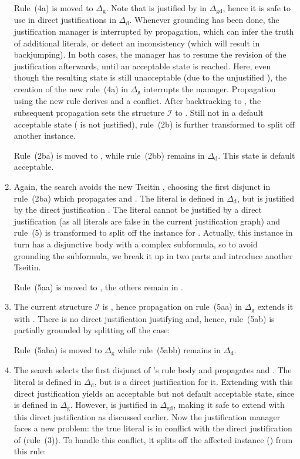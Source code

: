 \documentclass[11pt]{article}
\newcommand{\m}[1]{\ensuremath{#1}\xspace}
\newcommand{\I}{\m{\mathcal{I}}}
\newcommand{\D}{\m{\Delta}}
\theoremstyle{plain}
\theoremstyle{definition}
\theoremstyle{example_basic}
\theoremstyle{example_contd}
\theoremstyle{plain}
\newcommand{\Dg}{\ensuremath{\D_\text{g}}\xspace}
\newcommand{\Dd}{\ensuremath{\D_\text{d}}\xspace}
\newcommand{\Dgd}{\ensuremath{\D_\text{gd}}\xspace}
\newcommand{\change}[1]{#1}
\begin{document}
\begin{enumerate}
  Rule~(4a) is moved to \Dg. \change{Note that  is justified by  in \Dgd,} hence it is safe to use  in direct justifications in \Dd. \change{Whenever grounding has been done, the justification manager is interrupted by propagation, which can infer the truth of additional literals, or detect an inconsistency (which will result in backjumping). In both cases, the manager has to resume the revision of the justification afterwards, until an acceptable state is reached. Here, even though the resulting state is still unacceptable (due to the unjustified ), the creation of the new rule~(4a) in \Dg interrupts the manager. Propagation using the new rule derives  and a conflict.  After backtracking to , the subsequent propagation sets the structure \I to . Still not in a default acceptable state ( is not justified), rule~(2b) is further transformed to split off another instance.}
 
 Rule~(2ba) is moved to , while rule~(2bb) remains in \Dd. This state is default acceptable.

\item Again, the search avoids the new Tseitin , choosing the first
  disjunct in rule~(2ba) which propagates  and . The literal  is defined in \Dd, but is justified by the direct justification . The literal  cannot be justified \change{by a direct justification} (as all  literals are false in the current justification graph) and rule~(5) is transformed to split off the instance for . Actually, this instance in turn has a disjunctive body with a complex subformula, so to avoid grounding the subformula, we break it up in two parts and introduce another Tseitin.
  
  Rule~(5aa)  is moved to , the others remain in .

\item The current structure \I is , hence propagation on rule~(5aa) in \Dg extends it
  with . There is no direct justification justifying  and, hence, rule~(5ab) is partially grounded by splitting off the  case:
  
Rule~(5aba) is moved to \Dg while rule~(5abb) remains in \Dd.

\item The search selects the first disjunct of 's rule body and propagates   and . The literal  is defined in \Dd, but  is a direct justification for it. \change{Extending \jgraph with this direct justification yields an acceptable but not default acceptable state, since  is defined in \Dg. However,   is justified in \Dgd, making it safe to extend \jgraph with this direct justification as discussed earlier.} \change{Now the justification manager faces a new problem: the true literal  is in conflict with the direct justification  of  (rule~(3)). To handle this conflict, it splits off the affected instance () from this rule:}


\end{enumerate}
\end{document}
